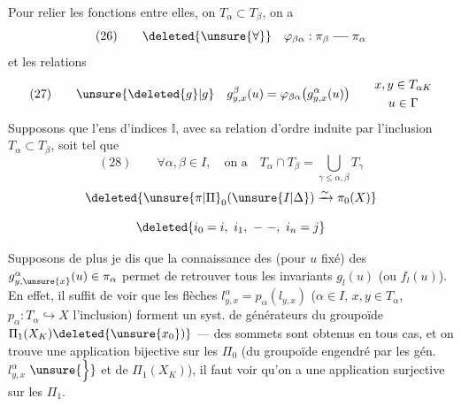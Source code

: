 Pour relier les fonctions entre elles, 
on 
 $T_\alpha\subset T_\beta$, on a
\[
(26)\qquad
\deleted{\unsure{\forall}}\quad
\varphi_{\beta\alpha}:\pi_\beta
\mathbin{\relbar\joinrel\relbar}\pi_\alpha
\]
et les relations
\[
(27)\qquad
\unsure{\deleted{g}|g}\quad
g_{y,x}^{\beta}(u)
=\varphi_{\beta\alpha}\bigl(g_{y,x}^{\alpha}(u)\bigr)
\qquad
\begin{gathered}
x,y\in T_{\alpha K}\\
u\in\Gamma
\end{gathered}
\]
Supposons que l'ens d'indices $\mathbb{I}$,
avec sa relation d'ordre induite par l'inclusion
$T_\alpha\subset T_\beta$, soit tel que
\[
(28)\qquad
\forall\alpha,\beta\in I,\quad\text{on a}\quad
T_\alpha\cap T_\beta
=\bigcup_{\gamma\le\alpha,\beta}T_\gamma
\]
\[
\deleted{\unsure{\pi|\Pi}_0(\unsure{I|\Delta})\xrightarrow{\sim}\pi_0(X)}
\]



\[
\deleted{i_0=i,\ i_1,\ \mathord{-}\ \mathord{-},\ i_n=j}
\]



Supposons de plus    je dis que la connaissance des (pour $u$ fixé) des $g_{y,\unsure{x}}^\alpha(u)\in\pi_\alpha$  permet de retrouver tous les invariants $g_l(u)$ (ou $f_l(u)$). En effet, il suffit de voir que les flèches $l_{y,x}^\alpha=p_\alpha(l_{y,x})$ ($\alpha\in I$, $x,y\in T_\alpha$, $p_\alpha:T_\alpha\hookrightarrow X$ l'inclusion)  forment un syst. de générateurs du groupoïde $\Pi_1(X_K)\deleted{\unsure{x_0})}$ ---  des  sommets sont obtenus en tous cas, et on trouve une application bijective sur les $\Pi_0$ (du groupoïde engendré par les gén. $l_{y,x}^\alpha$   $\unsure{\Big\}}$ et de $\Pi_1(X_K)$), il faut voir qu'on a une application surjective sur les $\Pi_1$.

